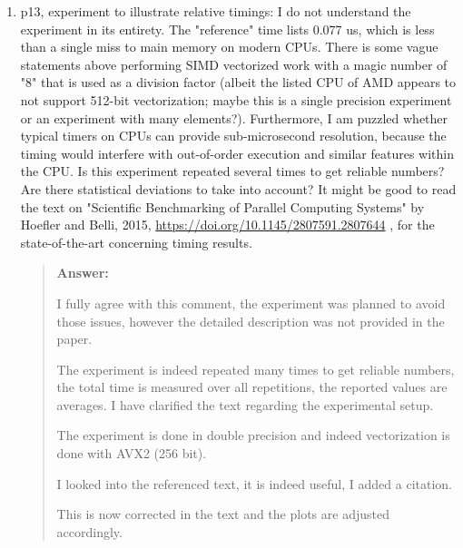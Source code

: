 \documentclass[11pt, a4paper]{article}
\newenvironment{answer}{%
      \begin{quote}%
            \color{blue!80!black}%
            \textbf{Answer:}%
            }{%
      \end{quote}%
}
\begin{document}
\begin{enumerate}[label=\textbullet, wide, labelindent=0pt]
      \item p13, experiment to illustrate relative timings: I do not understand the experiment in its entirety. The
            "reference" time lists 0.077 us, which is less than a single miss to main memory on modern CPUs. There is
            some vague
            statements above performing SIMD vectorized work with a magic number of "8" that is used as a division
            factor
            (albeit
            the listed CPU of AMD appears to not support 512-bit vectorization; maybe this is a single precision
            experiment or an
            experiment with many elements?). Furthermore, I am puzzled whether typical timers on CPUs can provide
            sub-microsecond
            resolution, because the timing would interfere with out-of-order execution and similar features within the
            CPU. Is this
            experiment repeated several times to get reliable numbers? Are there statistical deviations to take into
            account? It
            might be good to read the text on "Scientific Benchmarking of Parallel Computing Systems" by Hoefler and
            Belli, 2015,
            \url{https://doi.org/10.1145/2807591.2807644} , for the state-of-the-art concerning timing results.
            \begin{answer}
                  I fully agree with this comment, the experiment was planned to avoid those issues, however the
                  detailed
                  description was not provided in the paper.

                  The experiment is indeed repeated many
                  times to get reliable numbers, the total time is measured over all repetitions, the reported values
                  are averages. I have clarified the text regarding the experimental setup.

                  The experiment is done in double precision and indeed vectorization is done with AVX2 (256 bit).

                  I looked into the referenced text, it is indeed useful, I added a citation.

                  This is now corrected in the text and the plots are adjusted accordingly.
            \end{answer}


\end{enumerate}
\end{document}
